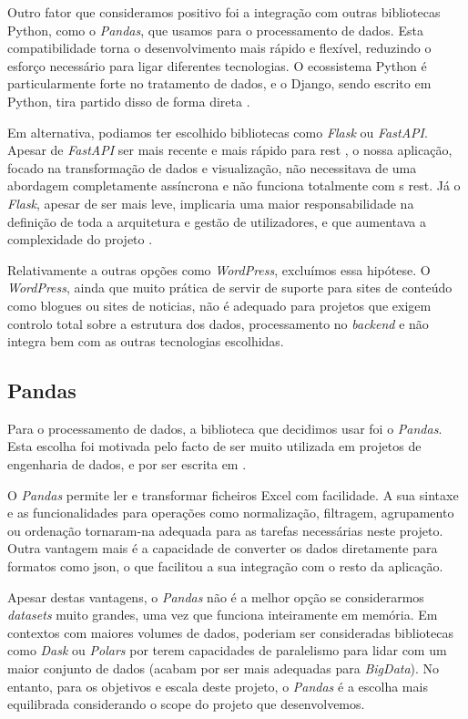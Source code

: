 Outro fator que consideramos positivo foi a integração com outras bibliotecas Python, como o \textit{Pandas}, que usamos para o processamento de dados. Esta compatibilidade torna o desenvolvimento mais rápido e flexível, reduzindo o esforço necessário para ligar diferentes tecnologias. O ecossistema Python é particularmente forte no tratamento de dados, e o Django, sendo escrito em Python, tira partido disso de forma direta \cite{vanrossum2001python}.

Em alternativa, podiamos ter escolhido bibliotecas como \textit{Flask} ou \textit{FastAPI}. Apesar de \textit{FastAPI} ser mais recente e mais rápido para  \gls{rest} \cite{tiangolo2018fastapi}, o nossa aplicação, focado na transformação de dados e visualização, não necessitava de uma abordagem completamente assíncrona e não funciona totalmente com s \gls{rest}. Já o \textit{Flask}, apesar de ser mais leve, implicaria uma maior responsabilidade na definição de toda a arquitetura e gestão de utilizadores, e que aumentava a complexidade do projeto \cite{grinberg2018flask}.

Relativamente a outras opções como \textit{WordPress}, excluímos essa hipótese. O \textit{WordPress}, ainda que muito prática de servir de suporte para sites de conteúdo como blogues ou sites de noticias, não é adequado para projetos que exigem controlo total sobre a estrutura dos dados, processamento no \textit{backend} e não integra bem com as outras tecnologias escolhidas.

\subsection{Pandas}

Para o processamento de dados, a biblioteca que decidimos usar foi o \textit{Pandas}. Esta escolha foi motivada pelo facto de ser muito utilizada em projetos de engenharia de dados, e por ser escrita em .

O \textit{Pandas} permite ler e transformar ficheiros Excel com facilidade. A sua sintaxe e as funcionalidades para operações como normalização, filtragem, agrupamento ou ordenação tornaram-na adequada para as tarefas necessárias neste projeto.  Outra vantagem mais é a capacidade de converter os dados diretamente para formatos como \gls{json}, o que facilitou a sua integração com o resto da aplicação.

Apesar destas vantagens, o \textit{Pandas} não é a melhor opção se considerarmos \textit{datasets} muito grandes, uma vez que funciona inteiramente em memória. Em contextos com maiores volumes de dados, poderiam ser consideradas bibliotecas como \textit{Dask} ou \textit{Polars} por terem capacidades de paralelismo para lidar com um maior conjunto de dados (acabam por ser mais adequadas para \textit{BigData}). No entanto, para os objetivos e escala deste projeto, o \textit{Pandas} é a escolha mais equilibrada considerando o scope do projeto que desenvolvemos.

